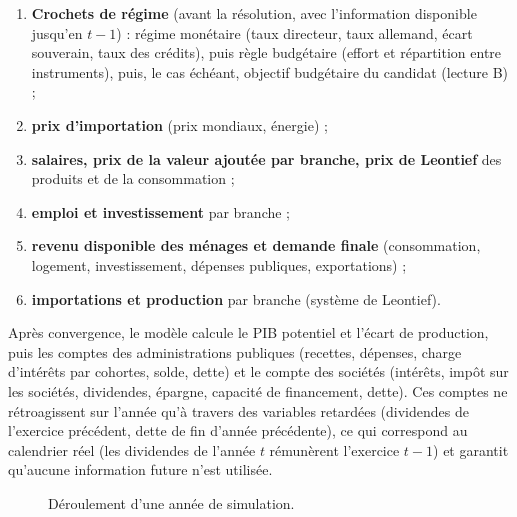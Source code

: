 \documentclass[
  11pt,
  11pt,
  a4paper,
  openany]{book}
\providecommand{\tightlist}{%
  \setlength{\itemsep}{0pt}\setlength{\parskip}{0pt}}
\begin{document}
\begin{enumerate}
\def\labelenumi{\arabic{enumi}.}
\tightlist
\item
  \textbf{Crochets de régime} (avant la résolution, avec l'information
  disponible jusqu'en \(t-1\)) : régime monétaire (taux directeur, taux
  allemand, écart souverain, taux des crédits), puis règle budgétaire
  (effort et répartition entre instruments), puis, le cas échéant,
  objectif budgétaire du candidat (lecture B) ;
\item
  \textbf{prix d'importation} (prix mondiaux, énergie) ;
\item
  \textbf{salaires, prix de la valeur ajoutée par branche, prix de
  Leontief} des produits et de la consommation ;
\item
  \textbf{emploi et investissement} par branche ;
\item
  \textbf{revenu disponible des ménages et demande finale}
  (consommation, logement, investissement, dépenses publiques,
  exportations) ;
\item
  \textbf{importations et production} par branche (système de Leontief).
\end{enumerate}

Après convergence, le modèle calcule le PIB potentiel et l'écart de
production, puis les comptes des administrations publiques (recettes,
dépenses, charge d'intérêts par cohortes, solde, dette) et le compte des
sociétés (intérêts, impôt sur les sociétés, dividendes, épargne,
capacité de financement, dette). Ces comptes ne rétroagissent sur
l'année qu'à travers des variables retardées (dividendes de l'exercice
précédent, dette de fin d'année précédente), ce qui correspond au
calendrier réel (les dividendes de l'année \(t\) rémunèrent l'exercice
\(t-1\)) et garantit qu'aucune information future n'est utilisée.

\begin{figure}[htbp]
\centering
{}
\caption{Déroulement d'une année de simulation.}
\end{figure}
\end{document}
